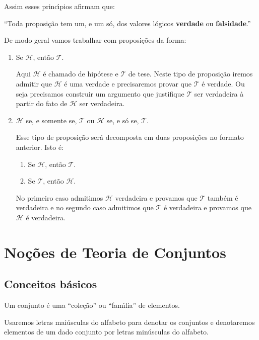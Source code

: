 Assim esses princ{\'\i}pios afirmam que:
\begin{center}
	``Toda proposi\c{c}\~ao tem um, e um s\'o, dos valores l\'ogicos \textbf{verdade} ou \textbf{falsidade}.''
\end{center}

De modo geral vamos trabalhar com proposi\c{c}\~oes da forma:
\begin{enumerate}[label={\roman*})]
	\item Se $\mathcal{H}$, ent\~ao $\mathcal{T}$.

	Aqui $\mathcal{H}$ \'e chamado de hip\'otese e $\mathcal{T}$ de tese. Neste tipo de proposi\c{c}\~ao iremos admitir que $\mathcal{H}$ \'e uma verdade e precisaremos provar que $\mathcal{T}$ \'e verdade. Ou seja precisamos construir um argumento que justifique $\mathcal{T}$ ser verdadeira \`a partir do fato de $\mathcal{H}$ ser verdadeira.

	\item $\mathcal{H}$ se, e somente se, $\mathcal{T}$ ou $\mathcal{H}$ se, e s\'o se, $\mathcal{T}$.

	Esse tipo de proposi\c{c}\~ao ser\'a decomposta em duas proposi\c{c}\~oes no formato anterior. Isto \'e:
	\begin{enumerate}[label={\alph*})]
		\item Se $\mathcal{H}$, ent\~ao $\mathcal{T}$.
		\item Se $\mathcal{T}$, ent\~ao $\mathcal{H}$.
	\end{enumerate}

	No primeiro caso admitimos $\mathcal{H}$ verdadeira e provamos que $\mathcal{T}$ tamb\'em \'e verdadeira e no segundo caso admitimos que $\mathcal{T}$ \'e verdadeira e provamos que $\mathcal{H}$ \'e verdadeira.
\end{enumerate}


\chapter{No{\c c}{\~o}es de Teoria de Conjuntos}
\section{Conceitos b{\'a}sicos}

Um conjunto {\'e} uma ``cole{\c c}{\~a}o'' ou ``fam{\'\i}lia'' de elementos.

Usaremos letras mai{\'u}sculas do alfabeto para denotar os conjuntos e denotaremos elementos de um dado conjunto por letras min{\'u}sculas do alfabeto.

